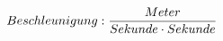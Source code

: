 \documentclass[preview]{standalone}
\begin{document}
\begin{align*}
\special{dvisvgm:raw <g id='unique000'>}Beschleunigung: \frac{Meter}{Sekunde \cdot  Sekunde}\special{dvisvgm:raw </g>}
\end{align*}
\end{document}
